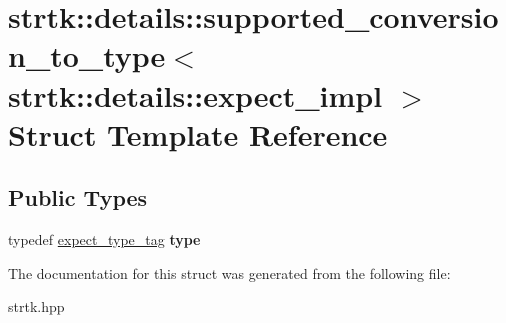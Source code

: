 \hypertarget{structstrtk_1_1details_1_1supported__conversion__to__type_3_01strtk_1_1details_1_1expect__impl_01_4}{\section{strtk\-:\-:details\-:\-:supported\-\_\-conversion\-\_\-to\-\_\-type$<$ strtk\-:\-:details\-:\-:expect\-\_\-impl $>$ Struct Template Reference}
\label{structstrtk_1_1details_1_1supported__conversion__to__type_3_01strtk_1_1details_1_1expect__impl_01_4}
}
\subsection*{Public Types}
\begin{DoxyCompactItemize}
\item 
\hypertarget{structstrtk_1_1details_1_1supported__conversion__to__type_3_01strtk_1_1details_1_1expect__impl_01_4_a260d0d77d75222cd9780d6162120d304}{typedef \hyperlink{structstrtk_1_1details_1_1expect__type__tag}{expect\-\_\-type\-\_\-tag} {\bfseries type}}\label{structstrtk_1_1details_1_1supported__conversion__to__type_3_01strtk_1_1details_1_1expect__impl_01_4_a260d0d77d75222cd9780d6162120d304}

\end{DoxyCompactItemize}


The documentation for this struct was generated from the following file\-:\begin{DoxyCompactItemize}
\item 
strtk.\-hpp\end{DoxyCompactItemize}

